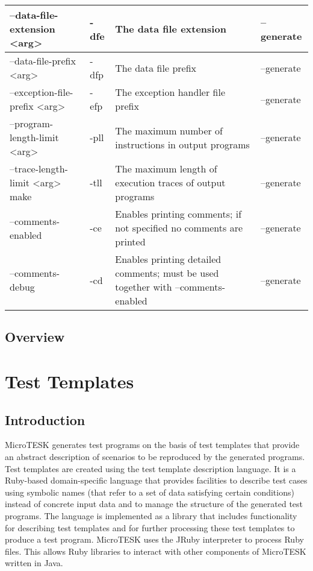 \documentclass[oneside,final,14pt]{extreport}
\begin{document}
\begin{tabular}{ | p{4cm} | p{1cm} | p{5cm} | p{3cm} |}
  --data-file-extension <arg> & -dfe & The data file extension & --generate \\ \hline
  --data-file-prefix <arg> & -dfp & The data file prefix & --generate \\ \hline
  --exception-file-prefix <arg> & -efp & The exception handler file prefix & --generate \\ \hline
  --program-length-limit <arg> & -pll & The maximum number of instructions in output programs & --generate \\ \hline
  --trace-length-limit <arg> make& -tll & The maximum length of execution traces of output programs & --generate \\ \hline
  --comments-enabled & -ce & Enables printing comments; if not specified no comments are printed & --generate \\ \hline
  --comments-debug & -cd & Enables printing detailed comments; must be used together with --comments-enabled  & --generate \\ \hline
\end{tabular}


\section{Overview}


\chapter{Test Templates}


\section{Introduction}

MicroTESK generates test programs on the basis of test templates that provide
an abstract description of scenarios to be reproduced by the generated programs.
Test templates are created using the test template description language. It is
a Ruby-based domain-specific language that provides facilities to describe test
cases using symbolic names (that refer to a set of data satisfying certain
conditions) instead of concrete input data and to manage the structure of the
generated test programs. The language is implemented as a library that includes
functionality for describing test templates and for further processing these test
templates to produce a test program. MicroTESK uses the JRuby interpreter to process
Ruby files. This allows Ruby libraries to interact with other components of MicroTESK
written in Java.
\end{document}
